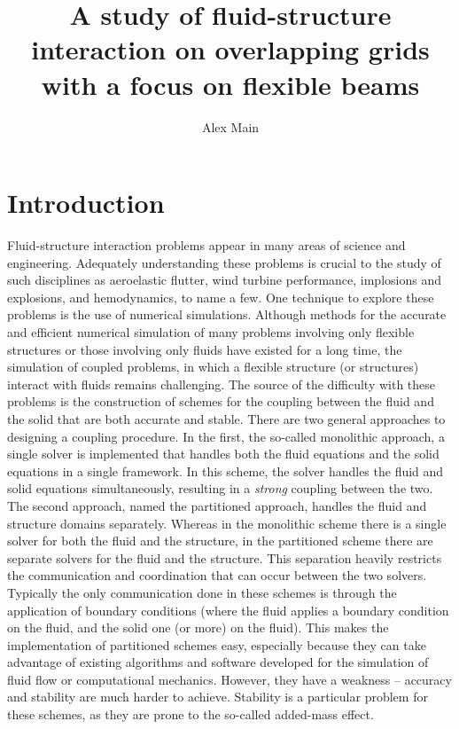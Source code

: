 \documentclass{article}
\title{A study of fluid-structure interaction on overlapping grids with a focus on flexible beams}
\author{Alex Main}
\begin{document}
\maketitle
\section{Introduction}
\thispagestyle{firststyle}
Fluid-structure interaction problems appear in many areas of science and engineering.  
Adequately understanding these problems is crucial to the study of such disciplines as aeroelastic flutter, wind turbine performance, implosions and explosions, and hemodynamics, to name a few.
One technique to explore these problems is the use of numerical simulations.  
Although methods for the accurate and efficient numerical simulation of many problems involving only flexible structures or those involving only fluids have existed for a long time, the simulation of coupled problems, in which a flexible structure (or structures) interact with fluids remains challenging.
The source of the difficulty with these problems is the construction of schemes for the coupling between the fluid and the solid that are both accurate and stable.  
There are two general approaches to designing a coupling procedure.  
In the first, the so-called monolithic approach, a single solver is implemented that handles both the fluid equations and the solid equations in a single framework.  
In this scheme, the solver handles the fluid and solid equations simultaneously, resulting in a \emph{strong} coupling between the two.
The second approach, named the partitioned approach, handles the fluid and structure domains separately.  
Whereas in the monolithic scheme there is a single solver for both the fluid and the structure, in the partitioned scheme there are separate solvers for the fluid and the structure.
This separation heavily restricts the communication and coordination that can occur between the two solvers. 
Typically the only communication done in these schemes is through the application of boundary conditions (where the fluid applies a boundary condition on the fluid, and the solid one (or more) on the fluid).
This makes the implementation of partitioned schemes easy, especially because they can take advantage of existing algorithms and software developed for the simulation of fluid flow or computational mechanics.
However, they have a weakness -- accuracy and stability are much harder to achieve.
Stability is a particular problem for these schemes, as they are prone to the so-called added-mass effect.
\end{document}
